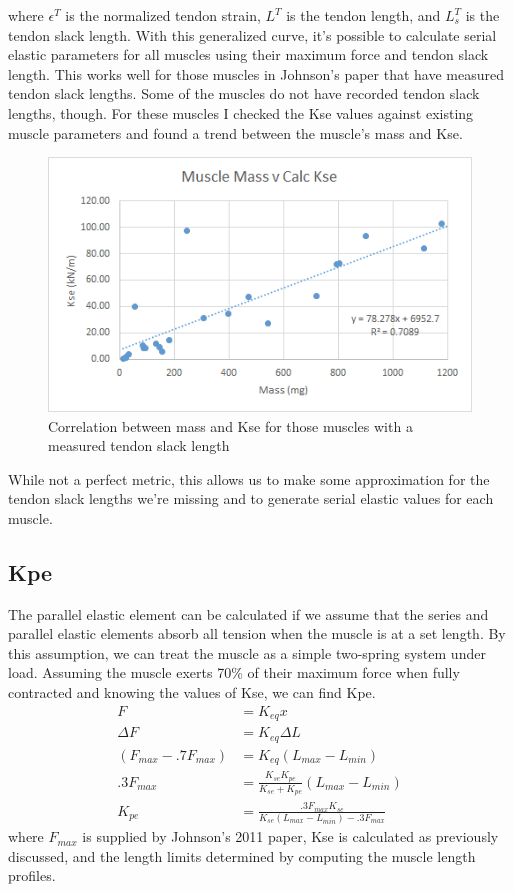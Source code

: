 \documentclass[runningheads,a4paper]{llncs}
\begin{document}
		where $\epsilon^{T}$ is the normalized tendon strain, $L^{T}$ is the tendon length, and $L_{s}^{T}$ is the tendon slack length. With this generalized curve, it's possible to calculate serial elastic parameters for all muscles using their maximum force and tendon slack length. This works well for those muscles in Johnson's paper that have measured tendon slack lengths. Some of the muscles do not have recorded tendon slack lengths, though. For these muscles I checked the Kse values against existing muscle parameters and found a trend between the muscle's mass and Kse.
			\begin{figure}
				\centering
				\includegraphics[width=.7\textwidth]{zajac3.png}
				\caption{Correlation between mass and Kse for those muscles with a measured tendon slack length}
				\label{fig:zajac3}
			\end{figure}
		While not a perfect metric, this allows us to make some approximation for the tendon slack lengths we're missing and to generate serial elastic values for each muscle.
		
	\subsection{Kpe}
		The parallel elastic element can be calculated if we assume that the series and parallel elastic elements absorb all tension when the muscle is at a set length. By this assumption, we can treat the muscle as a simple two-spring system under load. Assuming the muscle exerts 70\% of their maximum force when fully contracted and knowing the values of Kse, we can find Kpe.
			\begin{align*}
				F &= K_{eq} x \\
				\Delta F &= K_{eq} \Delta L \\
				(F_{max} - .7 F_{max}) &= K_{eq} (L_{max}-L_{min}) \\
				.3 F_{max} &= \frac{K_{se}K_{pe}}{K_{se}+K_{pe}} (L_{max}-L_{min}) \\
				K_{pe} &= \frac{.3 F_{max} K_{se}}{K_{se} (L_{max}-L_{min})- .3 F_{max}}
			\end{align*}
		where $F_{max}$ is supplied by Johnson's 2011 paper, Kse is calculated as previously discussed, and the length limits determined by computing the muscle length profiles.
\end{document}
